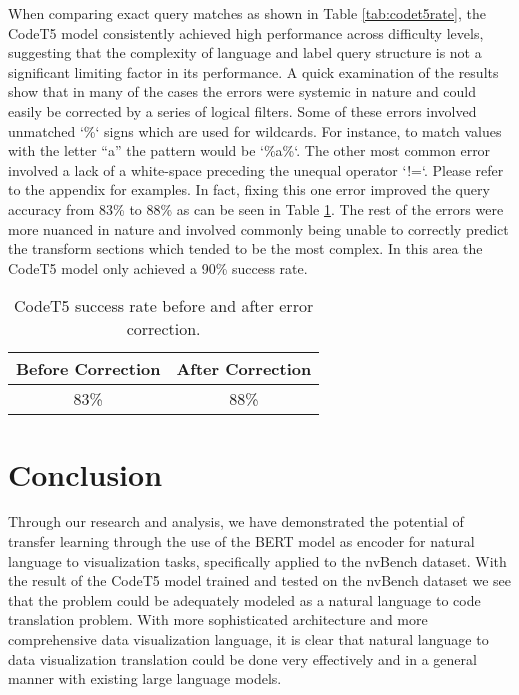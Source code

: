 \documentclass[
	a4paper, %
	10pt, %
	unnumberedsections, %
	twoside, %
]{t0003}
\begin{document}
When comparing exact query matches as shown in Table \ref{tab:codet5rate}, the CodeT5 model consistently achieved high performance across difficulty levels, suggesting that the complexity of language and label query structure is not a significant limiting factor in its performance. A quick examination of the results show that in many of the cases the errors were systemic in nature and could easily be corrected by a series of logical filters. Some of these errors involved unmatched `\%` signs which are used for wildcards. For instance, to match values with the letter “a'' the pattern would be `\%a\%`. The other most common error involved a lack of a white-space preceding the unequal operator `!=`. Please refer to the appendix for examples. In fact, fixing this one error improved the query accuracy from 83\% to 88\% as can be seen in Table \ref{tab:codet5error}. The rest of the errors were more nuanced in nature and involved commonly being unable to correctly predict the transform sections which tended to be the most complex. In this area the CodeT5 model only achieved a 90\% success rate.

\begin{table}
	\caption{CodeT5 success rate before and after error correction.}
	\centering
	\begin{tabular}{cc}
		\toprule
		Before Correction & After Correction \\
		\midrule
		83\% & 88\% \\
		\bottomrule
	\end{tabular}
	\label{tab:codet5error}
\end{table}

\section{Conclusion}

Through our research and analysis, we have demonstrated the potential of transfer learning through the use of the BERT model as encoder for natural language to visualization tasks, specifically applied to the nvBench dataset. With the result of the CodeT5 model trained and tested on the nvBench dataset we see that the problem could be adequately modeled as a natural language to code translation problem. With more sophisticated architecture and more comprehensive data visualization language, it is clear that natural language to data visualization translation could be done very effectively and in a general manner with existing large language models.
\end{document}
